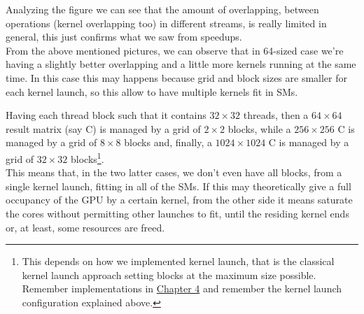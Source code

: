Analyzing the figure we can see that the amount of overlapping, between operations (kernel overlapping too) in different streams, is really limited in general, this just confirms what we saw from speedups.\\
From the above mentioned pictures, we can observe that in 64-sized case we're having a slightly better overlapping and a little more kernels running at the same time. In this case this may happens because grid and block sizes are smaller for each kernel launch, so this allow to have multiple kernels fit in SMs.

Having each thread block such that it contains \(32\times32\) threads, then a \(64\times64\) result matrix (say C) is managed by a grid of \(2\times2\) blocks, while a \(256\times256\) C is managed by a grid of \(8\times8\) blocks and, finally, a \(1024\times1024\) C is managed by a grid of \(32\times32\) blocks\footnote{This depends on how we implemented kernel launch, that is the classical kernel launch approach setting blocks at the maximum size possible. Remember implementations in \hyperref[chap:impl]{Chapter 4} and remember the kernel launch configuration explained above.}.\\
This means that, in the two latter cases, we don't even have all blocks, from a single kernel launch, fitting in all of the SMs. If this may theoretically give a full occupancy of the GPU by a certain kernel, from the other side it means saturate the cores without permitting other launches to fit, until the residing kernel ends or, at least, some resources are freed.

